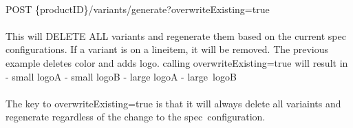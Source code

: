 \documentclass{memoir}%
\begin{document}
%
\paragraph*{}%
POST \{productID\}/variants/generate?overwriteExisting=true

%
\paragraph*{}%
This will DELETE ALL variants and regenerate them based on the current spec configurations. If a variant is on a lineitem, it will be removed. The previous example deletes color and adds logo. calling overwriteExisting=true will result in \newline%
{-} small logoA\newline%
{-} small logoB\newline%
{-} large logoA\newline%
{-} large~logoB

%
\paragraph*{}%
The key to overwriteExisting=true is that it will always delete all variaints and regenerate regardless of the change to the spec~configuration.

%
\end{document}
